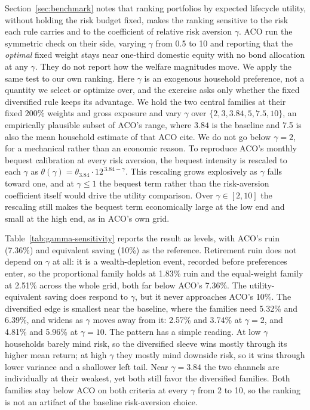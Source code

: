 \documentclass[11pt]{article}
\begin{document}
Section~\ref{sec:benchmark} notes that ranking portfolios by expected lifecycle
utility, without holding the risk budget fixed, makes the ranking sensitive to
the risk each rule carries and to the coefficient of relative risk aversion
$\gamma$. ACO run the symmetric check on their side, varying $\gamma$ from
0.5 to 10 and reporting that the \emph{optimal} fixed weight stays near
one-third domestic equity with no bond allocation at any $\gamma$. They do not
report how the welfare magnitudes move. We apply the same test to our own
ranking. Here $\gamma$ is an exogenous household preference, not a quantity we
select or optimize over, and the exercise asks only whether the fixed
diversified rule keeps its advantage. We hold the two central families at their
fixed $200\%$ weights and gross exposure and vary $\gamma$ over $\{2, 3, 3.84,
5, 7.5, 10\}$, an empirically plausible subset of ACO's range, where $3.84$ is
the baseline and 7.5 is also the mean household estimate of
\citet{CalvetCampbellGomesSodini2025} that ACO cite. We do not go below
$\gamma=2$, for a mechanical rather than an economic reason. To reproduce
ACO's monthly bequest calibration at every risk aversion, the bequest
intensity is rescaled to each $\gamma$ as $\theta(\gamma) = \theta_{3.84}\cdot
12^{\,3.84-\gamma}$. This rescaling grows explosively as $\gamma$ falls toward
one, and at $\gamma\le 1$ the bequest term rather than the risk-aversion
coefficient itself would drive the utility comparison. Over
$\gamma\in[2,10]$ the rescaling still makes the bequest term economically
large at the low end and small at the high end, as in ACO's own grid.

Table~\ref{tab:gamma-sensitivity} reports the result as levels, with ACO's
ruin (7.36\%) and equivalent saving (10\%) as the reference. Retirement
ruin does not depend on $\gamma$ at all: it is a wealth-depletion event,
recorded before preferences enter, so the
proportional family holds at 1.83\% ruin and the equal-weight family at
2.51\% across the whole grid, both far below ACO's 7.36\%. The
utility-equivalent saving does respond to $\gamma$, but it never approaches
ACO's 10\%. The diversified edge is smallest near the baseline, where the
families need 5.32\% and 6.39\%, and widens as $\gamma$ moves away from it:
2.57\% and 3.74\% at $\gamma=2$, and 4.81\% and 5.96\% at $\gamma=10$. The
pattern has a simple reading. At low $\gamma$ households barely mind risk, so
the diversified sleeve wins mostly through its higher mean return; at high
$\gamma$ they mostly mind downside risk, so it wins through lower variance
and a shallower left tail. Near $\gamma = 3.84$ the two channels are
individually at their weakest, yet both still favor the diversified families.
Both families stay below ACO on both criteria at every $\gamma$ from 2 to
10, so the ranking is not an artifact of the baseline risk-aversion choice.
\end{document}
